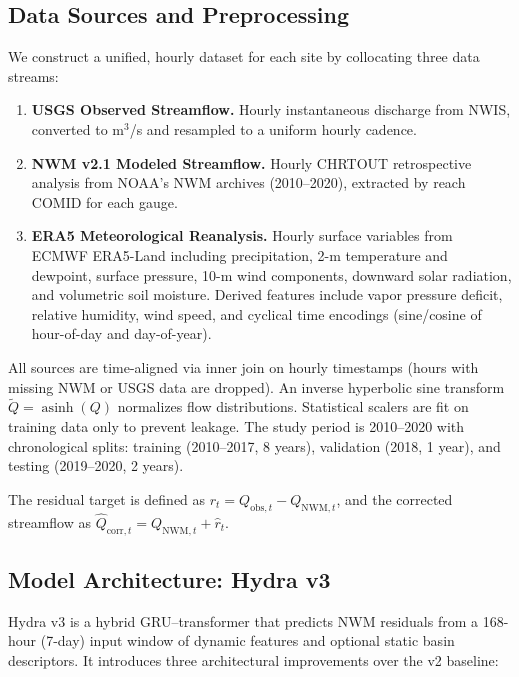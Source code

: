 \documentclass[draft]{agujournal2019}
\begin{document}
\subsection{Data Sources and Preprocessing}

We construct a unified, hourly dataset for each site by collocating three data streams:

\begin{enumerate}
    \item \textbf{USGS Observed Streamflow.} Hourly instantaneous discharge from NWIS, converted to m$^{3}$/s and resampled to a uniform hourly cadence.
    \item \textbf{NWM v2.1 Modeled Streamflow.} Hourly CHRTOUT retrospective analysis from NOAA's NWM archives (2010--2020), extracted by reach COMID for each gauge.
    \item \textbf{ERA5 Meteorological Reanalysis.} Hourly surface variables from ECMWF ERA5-Land including precipitation, 2-m temperature and dewpoint, surface pressure, 10-m wind components, downward solar radiation, and volumetric soil moisture. Derived features include vapor pressure deficit, relative humidity, wind speed, and cyclical time encodings (sine/cosine of hour-of-day and day-of-year).
\end{enumerate}

All sources are time-aligned via inner join on hourly timestamps (hours with missing NWM or USGS data are dropped). An inverse hyperbolic sine transform $\tilde{Q} = \operatorname{asinh}(Q)$ normalizes flow distributions. Statistical scalers are fit on training data only to prevent leakage. The study period is 2010--2020 with chronological splits: training (2010--2017, 8 years), validation (2018, 1 year), and testing (2019--2020, 2 years).

The residual target is defined as $r_t = Q_{\text{obs},t} - Q_{\text{NWM},t}$, and the corrected streamflow as $\hat{Q}_{\text{corr},t} = Q_{\text{NWM},t} + \hat{r}_t$.

\subsection{Model Architecture: Hydra v3}

Hydra v3 is a hybrid GRU--transformer that predicts NWM residuals from a 168-hour (7-day) input window of dynamic features and optional static basin descriptors. It introduces three architectural improvements over the v2 baseline:
\end{document}
